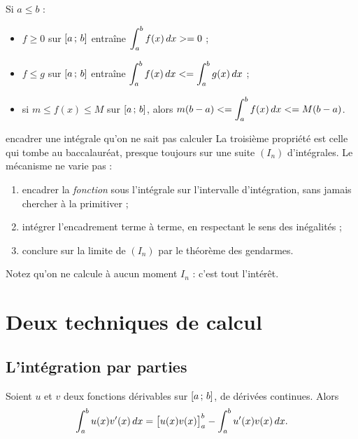 \begin{propriete}
Si $a \leq b$ :
\begin{itemize}[leftmargin=1.4em, itemsep=0.18em]
  \item $f \geq 0$ sur $\left[a\,;\,b\right]$ entraîne $\displaystyle\int_{a}^{b} f(x)\,dx >= 0$ ;
  \item $f \leq g$ sur $\left[a\,;\,b\right]$ entraîne
        $\displaystyle\int_{a}^{b} f(x)\,dx <= \int_{a}^{b} g(x)\,dx$ ;
  \item si $m \leq f(x) \leq M$ sur $\left[a\,;\,b\right]$, alors
        $m(b-a) <= \displaystyle\int_{a}^{b} f(x)\,dx <= M(b-a)$.
\end{itemize}
\end{propriete}

\begin{methode}{encadrer une intégrale qu'on ne sait pas calculer}
La troisième propriété est celle qui tombe au baccalauréat, presque toujours
sur une suite $(I_{n})$ d'intégrales. Le mécanisme ne varie pas :

\begin{enumerate}[label=\textbf{\arabic*.}, leftmargin=*, itemsep=0.28em]
  \item encadrer la \emph{fonction} sous l'intégrale sur l'intervalle
        d'intégration, sans jamais chercher à la primitiver ;
  \item intégrer l'encadrement terme à terme, en respectant le sens des
        inégalités ;
  \item conclure sur la limite de $(I_{n})$ par le théorème des gendarmes.
\end{enumerate}

Notez qu'on ne calcule à aucun moment $I_{n}$ : c'est tout l'intérêt.
\end{methode}

\section{Deux techniques de calcul}

\subsection{L'intégration par parties}

\begin{theoreme}
Soient $u$ et $v$ deux fonctions dérivables sur $\left[a\,;\,b\right]$, de
dérivées continues. Alors
\[
  \int_{a}^{b} u(x)v'(x)\,dx
  = \bigl[u(x)v(x)\bigr]_{a}^{b} - \int_{a}^{b} u'(x)v(x)\,dx .
\]
\end{theoreme}

